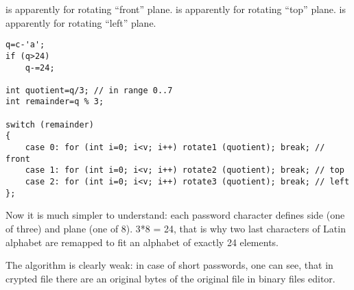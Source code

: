 { is apparently for rotating ``front'' plane. 
 is apparently for rotating ``top'' plane. 
 is apparently for rotating ``left'' plane.}


\begin{lstlisting}
q=c-'a';
if (q>24)
	q-=24;

int quotient=q/3; // in range 0..7
int remainder=q % 3;

switch (remainder)
{
    case 0: for (int i=0; i<v; i++) rotate1 (quotient); break; // front
    case 1: for (int i=0; i<v; i++) rotate2 (quotient); break; // top
    case 2: for (int i=0; i<v; i++) rotate3 (quotient); break; // left
};
\end{lstlisting}

{Now it is much simpler to understand: each password character defines side (one of three) and plane (one of 8). 
3*8 = 24, that is why two last characters of Latin alphabet are remapped to fit an alphabet of exactly 
24 elements.}

{The algorithm is clearly weak: in case of short passwords, one can see,
that in crypted file there are 
an original bytes of the original file in binary files editor.}





